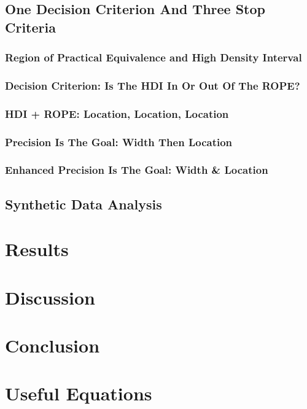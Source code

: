 \documentclass{article}
\begin{document}
\subsection{One Decision Criterion And Three Stop Criteria}
\subsubsection{Region of Practical Equivalence and High Density Interval}

\subsubsection{Decision Criterion: Is The HDI In Or Out Of The ROPE?}

\subsubsection{HDI + ROPE: Location, Location, Location}

\subsubsection{Precision Is The Goal: Width Then Location}

\subsubsection{Enhanced Precision Is The Goal: Width \& Location}

\subsection{Synthetic Data Analysis}


\section{Results}

\section{Discussion}

\section{Conclusion}

\section{Useful Equations}

\end{document}
